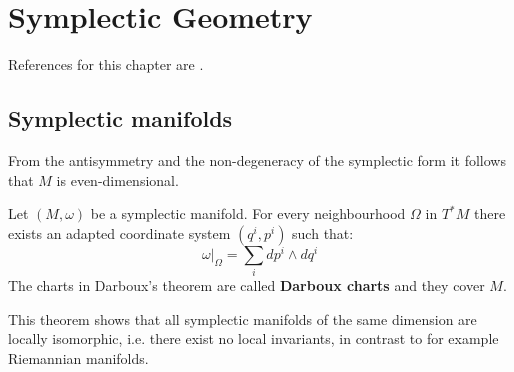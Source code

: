 \chapter{Symplectic Geometry}\label{chapter:symplectic}

	References for this chapter are \cite{mcduff, symplectic}.

\section{Symplectic manifolds}

	
	\begin{property}[Dimension]
		From the antisymmetry and the non-degeneracy of the symplectic form it follows that $M$ is even-dimensional.
	\end{property}
	
	\begin{theorem}[Darboux]
		Let $(M, \omega)$ be a symplectic manifold. For every neighbourhood $\Omega$ in $T^*M$ there exists an adapted coordinate system $(q^i, p^i)$ such that:
		\begin{equation}
			\left.\omega\right|_\Omega = \sum_idp^i\wedge dq^i
		\end{equation}		
		{\normalfont The charts in Darboux's theorem are called \textbf{Darboux charts} and they cover $M$.}
	\end{theorem}
	\begin{remark}
		This theorem shows that all symplectic manifolds of the same dimension are locally isomorphic, i.e. there exist no local invariants, in contrast to for example Riemannian manifolds.
	\end{remark}
	
